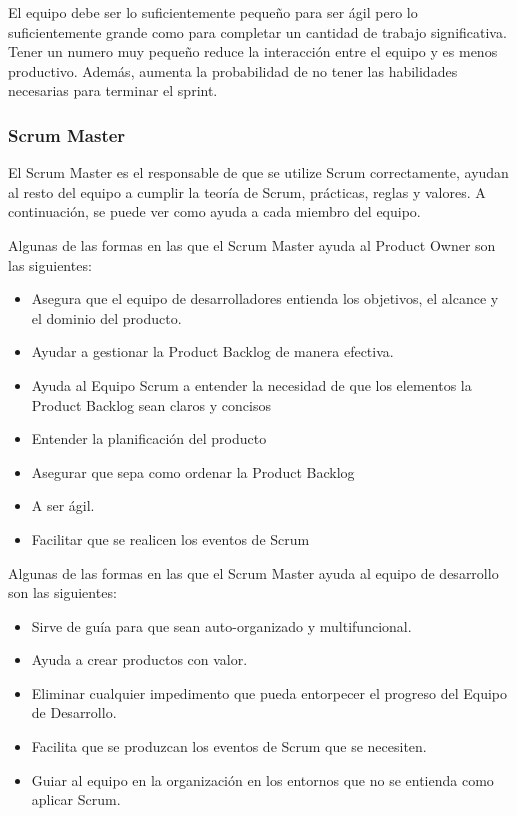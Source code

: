 El equipo debe ser lo suficientemente pequeño para ser ágil pero lo suficientemente grande como para completar 
un cantidad de trabajo significativa. Tener un numero muy pequeño reduce la interacción entre el equipo y es 
menos productivo. Además, aumenta la probabilidad de no tener las habilidades necesarias para terminar el 
sprint.

\subsubsection{Scrum Master}

El Scrum Master es el responsable de que se utilize Scrum correctamente, ayudan al resto del equipo a cumplir 
la teoría de Scrum, prácticas, reglas y valores. A continuación, se puede ver como ayuda a cada miembro del 
equipo.

Algunas de las formas en las que el Scrum Master ayuda al Product Owner son las siguientes:
\begin{itemize}
	\item Asegura que el equipo de desarrolladores entienda los objetivos, el alcance y el dominio del producto.
	\item Ayudar a gestionar la Product Backlog de manera efectiva.
	\item Ayuda al Equipo Scrum a entender la necesidad de que los elementos la Product Backlog sean claros y 
	concisos
	\item Entender la planificación del producto
	\item Asegurar que sepa como ordenar la Product Backlog
	\item A ser ágil.
	\item Facilitar que se realicen los eventos de Scrum
 \end{itemize}

Algunas de las formas en las que el Scrum Master ayuda al equipo de desarrollo son las siguientes:
\begin{itemize}
	\item Sirve de guía para que sean auto-organizado y multifuncional.
	\item Ayuda a crear productos con valor.
	\item Eliminar cualquier impedimento que pueda entorpecer el progreso del Equipo de Desarrollo.
	\item Facilita que se produzcan los eventos de Scrum que se necesiten.
	\item Guiar al equipo en la organización en los entornos que no se entienda como aplicar Scrum.
\end{itemize}

